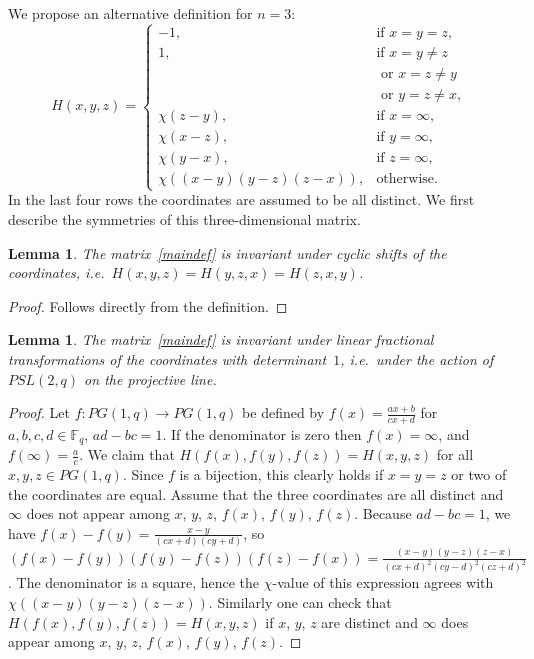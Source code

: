 \documentclass[12pt, reqno]{amsart}
\newtheorem{lemma}[theorem]{Lemma}
\def\F{\mathbb{F}}
\begin{document}
We propose an alternative definition for $n=3$:
\begin{equation}\label{maindef}
H(x,y,z)=\left\{\begin{array}{ll}
-1, & \mbox{if } x=y=z,\\
1, & \mbox{if } x=y\neq z\\
 & \mbox{ or } x=z\neq y\\
 & \mbox{ or } y=z\neq x,\\
\chi(z-y), & \mbox{if } x=\infty,\\
\chi(x-z), & \mbox{if } y=\infty,\\
\chi(y-x), & \mbox{if } z=\infty,\\
\chi((x-y)(y-z)(z-x)), & \mbox{otherwise.}
\end{array}\right.
\end{equation}
In the last four rows the coordinates are assumed to be all distinct. We first
describe the symmetries of this three-dimensional matrix.

\begin{lemma}\label{lm1}
The matrix~\eqref{maindef} is invariant under cyclic shifts of the coordinates,
i.e.\ $H(x,y,z)=H(y,z,x)=H(z,x,y)$.
\end{lemma}

\begin{proof}
Follows directly from the definition.
\end{proof}

\begin{lemma}\label{lm2}
The matrix~\eqref{maindef} is invariant under linear fractional transformations
of the coordinates with determinant~$1$, i.e.\ under the action of $PSL(2,q)$ on
the projective line.
\end{lemma}

\begin{proof}
Let $f:PG(1,q)\to PG(1,q)$ be defined by $f(x)=\frac{ax+b}{cx+d}$ for $a,b,c,d\in \F_q$,
$ad-bc=1$. If the denominator is zero then $f(x)=\infty$, and $f(\infty)=\frac{a}{c}$.
We claim that $H(f(x),f(y),f(z))=H(x,y,z)$ for all $x,y,z\in PG(1,q)$. Since $f$ is a
bijection, this clearly holds if $x=y=z$ or two of the coordinates are equal. Assume
that the three coordinates are all distinct and $\infty$ does not appear among $x$, $y$, $z$,
$f(x)$, $f(y)$, $f(z)$. Because $ad-bc=1$, we have $f(x)-f(y)=\frac{x-y}{(cx+d)(cy+d)}$,
so $(f(x)-f(y))(f(y)-f(z))(f(z)-f(x))=\frac{(x-y)(y-z)(z-x)}{(cx+d)^2(cy-d)^2(cz+d)^2}$.
The denominator is a square, hence the $\chi$-value of this expression agrees with
$\chi((x-y)(y-z)(z-x))$. Similarly one can check that $H(f(x),f(y),f(z))=H(x,y,z)$
if $x$, $y$, $z$ are distinct and $\infty$ does appear among $x$, $y$, $z$,
$f(x)$, $f(y)$, $f(z)$.
\end{proof}
\end{document}
